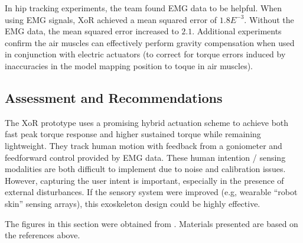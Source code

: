 In hip tracking experiments, the team found EMG data to be helpful.  When using EMG signals, XoR achieved a mean squared error of $1.8E^{-3}$.  Without the EMG data, the mean squared error increased to $2.1$.  Additional experiments confirm the air muscles can effectively perform gravity compensation when used in conjunction with electric actuators (to correct for torque errors induced by inaccuracies in the model mapping position to toque in air muscles).


\subsection{Assessment and Recommendations}

The XoR prototype uses a promising hybrid actuation scheme to achieve both fast peak torque response and higher sustained torque while remaining lightweight.  They track human motion with feedback from a goniometer and feedforward control provided by EMG data.  These human intention / sensing modalities are both difficult to implement due to noise and calibration issues.  However, capturing the user intent is important, especially in the presence of external disturbances.  If the sensory system were improved (e.g, wearable ``robot skin'' sensing arrays), this exoskeleton design could be highly effective. 


% 
% 

The figures in this section were obtained from \cite{xorDesign2011,XoRkinemExtraction2012}. Materials presented are based on the references above.
